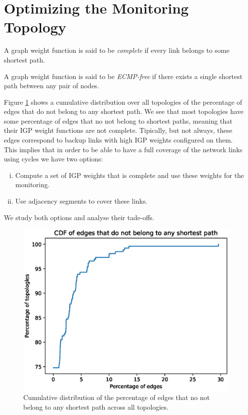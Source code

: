 
\section{Optimizing the Monitoring Topology}\label{sec:ecmpfree-algo}

\begin{definition}
A graph weight function is said to be \emph{complete} if every link belongs to some shortest path.
\end{definition}

\begin{definition}
A graph weight function is said to be \emph{ECMP-free} if there exists a single shortest path
between any pair of nodes.
\end{definition}

Figure \ref{fig:nonSP} shows a cumulative distribution over all topologies of the percentage of
edges that do not belong to any shortest path. We see that most topologies have some percentage of edges
that no not belong to shortest paths, meaning that their IGP weight functions are not complete. Tipically, but not always, these
edges correspond to backup links with high IGP weights configured on them.
This implies that in order to be able to have a full coverage of the network links using cycles we have two options:

\begin{enumerate}[i)]
 \item Compute a set of IGP weights that is complete and use these weights for the monitoring.
 \item Use adjacency segments to cover these links.
\end{enumerate}

We study both options and analyse their tade-offs.


\begin{figure}
\begin{center}
\includegraphics[width=.85\columnwidth]{./Network-lib/data/plot/nonSP.eps}
\end{center}
\caption{Cumulative distribution of the percentage of edges that no not belong to any shortest path across all topologies.}
\label{fig:nonSP}
\end{figure}




